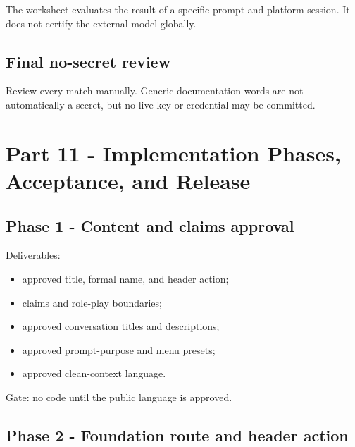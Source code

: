 \documentclass[11pt,letterpaper]{article}
\begin{document}
The worksheet evaluates the result of a specific prompt and platform session. It
does not certify the external model globally.

\subsection{Final no-secret review}


Review every match manually. Generic documentation words are not automatically a
secret, but no live key or credential may be committed.

\section{Part 11 - Implementation Phases, Acceptance, and Release}

\subsection{Phase 1 - Content and claims approval}

Deliverables:

\begin{itemize}
    \item approved title, formal name, and header action;
    \item claims and role-play boundaries;
    \item approved conversation titles and descriptions;
    \item approved prompt-purpose and menu presets;
    \item approved clean-context language.
\end{itemize}

Gate: no code until the public language is approved.

\subsection{Phase 2 - Foundation route and header action}
\end{document}
